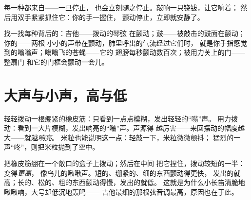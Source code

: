 \begin{proposition}\label{prop:g3:sound-around-us:novib}
每一种都来自——一旦停止，
也会立刻随之停止。敲响一只铙钹，让它响着；
然后用双手紧紧抓住它：你的手一握住，
颤动停止，立即就安静了。
\end{proposition}

\begin{example}[处处都有声源]\label{ex:g3:sound-around-us:sources}
找一找每种背后的：吉他——拨动的琴弦
在颤动；鼓——被敲击的鼓面在颤动；你的——两根
小小的声带在颤动，肺里呼出的气流经过它们时，
就是你手指感觉到的嗡嗡声；嗡嗡飞的苍蝇——它的
翅膀每秒颤动数百次；被用力关上的门——整扇门
和它的门框会颤动一会儿。
\end{example}

\section{大声与小声，高与低}

\begin{example}[响亮就是振动幅度大]\label{ex:g3:sound-around-us:loud}
轻轻拨动一根绷紧的橡皮筋：只看到一点点模糊，发出轻轻的“嗡”声。
用力拨动：看到一大片模糊，发出响亮的“嗡”声。声源得
越厉害——来回摆动的幅度越大——就越\emph{响亮}。
米粒也能说明这一点：轻敲一下，米粒微微颤抖；
猛烈的一声“咚”，则把米粒抛到了空中。
\end{example}

\begin{example}[高与低]\label{ex:g3:sound-around-us:pitch}
把橡皮筋绷在一个敞口的盒子上拨动；然后在中间
把它捏住，拨动较短的一半：变得\emph{更高}，
像鸟儿的啾啾声。短的、绷紧的、细的东西颤动得更快，
发出的就高；长的、松的、粗的东西颤动得慢，发出的就低。
这就是为什么小长笛清脆地啾啾响，大号却低沉地轰鸣——
吉他最细的那根弦音调最高，原因也在于此。
\end{example}

